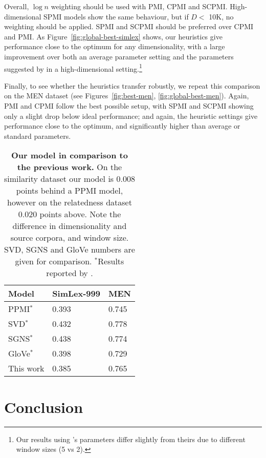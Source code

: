 \documentclass[11pt]{article}
\begin{document}
Overall, $\log n$ weighting should be used with PMI, CPMI and SCPMI. High-dimensional SPMI models show the same behaviour, but if $D<$ 10K, no weighting should be applied. SPMI and SCPMI should be preferred over CPMI and PMI. As Figure~\ref{fig:global-best-simlex} shows, our heuristics give performance close to the optimum for any dimensionality, with a large improvement over both an average parameter setting and the parameters suggested by \cite{TACL570} in a high-dimensional setting.\footnote{Our results using \cite{TACL570}'s parameters differ slightly from theirs due to different window sizes (5 vs 2).}



Finally, to see whether the heuristics transfer robustly, we repeat this comparison on the MEN dataset (see Figures~\ref{fig:best-men}, \ref{fig:global-best-men}). Again, PMI and CPMI follow the best possible setup, with SPMI and SCPMI showing only a slight drop below ideal performance; and again, the heuristic settings give performance close to the optimum, and significantly higher than average or standard parameters.

\begin{table}
  \centering
  \begin{tabular}{lll}
    \toprule
    Model           & SimLex-999 & MEN \\
    \midrule
    PPMI$^*$        & 0.393      & 0.745 \\
    SVD$^*$         & 0.432      & 0.778 \\
    SGNS$^*$        & 0.438      & 0.774 \\
    GloVe$^*$       & 0.398      & 0.729 \\
    \addlinespace
    This work       & 0.385      & 0.765 \\
    \bottomrule
  \end{tabular}
  \caption{\textbf{Our model in comparison to the previous work.} On the similarity dataset our model is 0.008 points behind a PPMI model, however on the relatedness dataset 0.020 points above. Note the difference in dimensionality and source corpora, and window size. SVD, SGNS and GloVe numbers are given for comparison. $^*$Results reported by .}
\label{tab:results}
\end{table}

\section{Conclusion}
\label{sec:conclusion}
\end{document}
